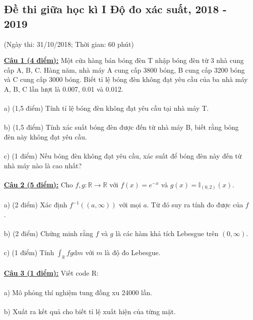 \documentclass[10pt, a4paper]{article}
\begin{document}
\subsection{Đề thi giữa học kì I Độ đo xác suất, 2018 - 2019}
\begin{center}
	\color{blue}(Ngày thi: 31/10/2018; Thời gian: 60 phút)
\end{center}
\color{red}\underline{\textbf{Câu 1 (4 điểm):}} \color{black}Một cửa hàng bán bóng đèn T nhập bóng đèn từ 3 nhà cung cấp A, B, C. Hàng năm, nhà máy A cung cấp 3800 bóng, B cung cấp 3200 bóng và C cung cấp 3000 bóng. Biết tỉ lệ bóng đèn không đạt yêu cầu của ba nhà máy A, B, C lần lượt là 0.007, 0.01 và 0.012.\\\\
\color{red}a) (1,5 điểm) \color{black}Tính tỉ lệ bóng đèn không đạt yêu cầu tại nhà máy T.\\\\
\color{red}b) (1,5 điểm) \color{black}Tính xác suất bóng đèn được đến từ nhà máy B, biết rằng bóng đèn này không đạt yêu cầu.\\\\
\color{red}c) (1 điểm) \color{black}Nếu bóng đèn không đạt yêu cầu, xác suất để bóng đèn này đến từ nhà máy nào là cao nhất?\\\\
\color{red}\underline{\textbf{Câu 2 (5 điểm):}} \color{black}Cho $f,g:\mathbb R\rightarrow\mathbb R$ với $f(x)=e^{-x}$ và $g(x)=\mathbb I_{(0,2)}(x)$.\\\\
\color{red}a) (2 điểm) \color{black}Xác định $f^{-1}((a,\infty))$ với mọi $a$. Từ đó suy ra tính đo được của $f$.\\\\
\color{red}b) (2 điểm) \color{black}Chứng minh rằng $f$ và $g$ là các hàm khả tích Lebesgue trên $(0,\infty)$.\\\\
\color{red}c) (1 điểm) \color{black}Tính $\displaystyle\int_{\mathbb R}fg\text{d}m$ với $m$ là độ đo Lebesgue.\\\\
\color{red}\underline{\textbf{Câu 3 (1 điểm):}} \color{black}Viết code R:\\\\
\color{red}a) \color{black}Mô phỏng thí nghiệm tung đồng xu 24000 lần.\\\\
\color{red}b) \color{black}Xuất ra kết quả cho biết tỉ lệ xuất hiện của từng mặt.
\end{document}
